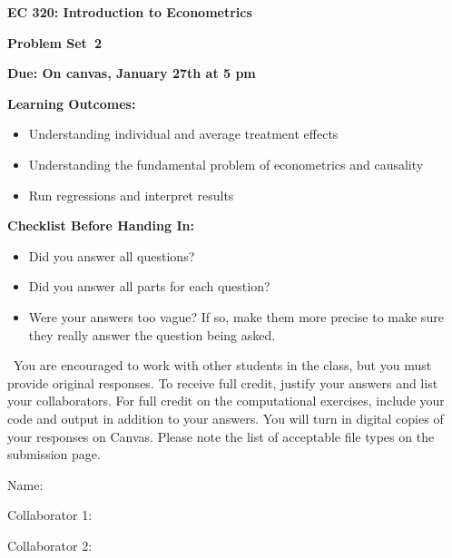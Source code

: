 \documentclass[11pt]{article}
\begin{document}
\begin{onehalfspacing}

\begin{center}
\textbf{EC 320: Introduction to Econometrics} \bigskip

\textbf{Problem Set\bigskip\ 2}
\bigskip
\end{center}


\noindent \textbf{Due: On canvas, January 27th at 5 pm}

\bigskip

\noindent \textbf{Learning Outcomes:}
\begin{itemize}
\item Understanding individual and average treatment effects
\item Understanding the fundamental problem of econometrics and causality
\item Run regressions and interpret results
\end{itemize}

\bigskip


\noindent \textbf{Checklist Before Handing In:}
\begin{itemize}
\item Did you answer all questions?
\item Did you answer all parts for each question?
\item Were your answers too vague? If so, make them more precise to make sure they really answer the question being asked.
\end{itemize}

\bigskip

\ You are encouraged to work with other students in the class, but you must provide original responses. To receive full credit, justify your answers and list your collaborators. For full credit on the computational exercises, include your code and output in addition to your answers. You will turn in digital copies of your responses on Canvas. Please note the list of acceptable file types on the submission page.  \\
\vspace{0.1in}

Name: 			\\
\vspace{0.1in}

Collaborator 1: \\

\vspace{0.1in}

Collaborator 2: \\
			

\end{onehalfspacing}
\end{document}
